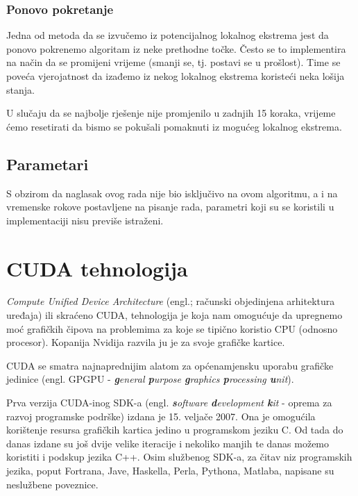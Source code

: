 \documentclass[times, utf8, zavrsni]{fer}
\begin{document}
\subsection{Ponovo pokretanje}

Jedna od metoda da se izvučemo iz potencijalnog lokalnog ekstrema jest da
ponovo pokrenemo algoritam iz neke prethodne točke. Često se to implementira
na način da se promijeni vrijeme (smanji se, tj. postavi se u prošlost).
Time se poveća vjerojatnost da izađemo iz nekog lokalnog ekstrema koristeći
neka lošija stanja. 

U slučaju da se najbolje rješenje nije promjenilo u zadnjih 15 koraka, 
vrijeme ćemo resetirati da bismo se pokušali pomaknuti iz mogućeg lokalnog
ekstrema. 

\section{Parametari}

S obzirom da naglasak ovog rada nije bio isključivo na ovom algoritmu, 
a i na vremenske rokove postavljene na pisanje rada, parametri koji su se
koristili u implementaciji nisu previše istraženi. 






\chapter{CUDA tehnologija}
\textit{Compute Unified Device Architecture} (engl.; računski objedinjena
arhitektura uređaja) ili skraćeno CUDA, tehnologija je
koja nam omogućuje da upregnemo moć grafičkih čipova na
problemima za koje se tipično koristio CPU (odnosno procesor).
Kopanija Nvidija razvila ju je za svoje grafičke kartice. 

CUDA se smatra najnaprednijim alatom za općenamjensku uporabu
grafičke jedinice (engl. GPGPU - \textit{\textbf{g}eneral
\textbf{p}urpose \textbf{g}raphics \textbf{p}rocessing \textbf{u}nit}).


Prva verzija CUDA-inog SDK-a (engl. \textit{\textbf{s}oftware
\textbf{d}evelopment \textbf{k}it} - oprema za razvoj programske
podrške) izdana je 15. veljače 2007.
Ona je omogućila korištenje resursa grafičkih kartica jedino u
programskom jeziku C. Od tada do danas izdane su još dvije velike
iteracije i nekoliko manjih te danas možemo koristiti i podskup
jezika C++. Osim službenog SDK-a, za čitav niz programskih jezika,
poput Fortrana, Jave, Haskella, Perla, Pythona, Matlaba, napisane su
neslužbene poveznice. 
\end{document}
